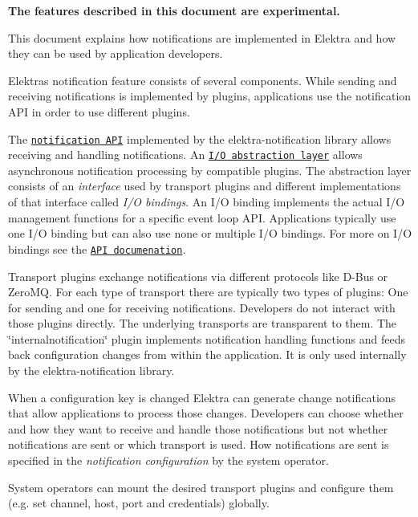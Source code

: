 {\bfseries The features described in this document are experimental.}

This document explains how notifications are implemented in Elektra and how they can be used by application developers.

Elektra\textquotesingle{}s notification feature consists of several components. While sending and receiving notifications is implemented by plugins, applications use the notification A\+PI in order to use different plugins.

The \href{https://doc.libelektra.org/api/current/html/group__kdbnotification.html}{\tt notification A\+PI} implemented by the {\ttfamily elektra-\/notification} library allows receiving and handling notifications. An \href{https://doc.libelektra.org/api/current/html/group__kdbio.html}{\tt I/O abstraction layer} allows asynchronous notification processing by compatible plugins. The abstraction layer consists of an {\itshape interface} used by transport plugins and different implementations of that interface called {\itshape I/O bindings}. An I/O binding implements the actual I/O management functions for a specific event loop A\+PI. Applications typically use one I/O binding but can also use none or multiple I/O bindings. For more on I/O bindings see the \href{https://doc.libelektra.org/api/current/html/group__kdbio.html}{\tt A\+PI documenation}.

Transport plugins exchange notifications via different protocols like D-\/\+Bus or Zero\+MQ. For each type of transport there are typically two types of plugins\+: One for sending and one for receiving notifications. Developers do not interact with those plugins directly. The underlying transports are transparent to them. The \char`\"{}internalnotification\char`\"{} plugin implements notification handling functions and feeds back configuration changes from within the application. It is only used internally by the {\ttfamily elektra-\/notification} library.



When a configuration key is changed Elektra can generate change notifications that allow applications to process those changes. Developers can choose whether and how they want to receive and handle those notifications but not whether notifications are sent or which transport is used. How notifications are sent is specified in the {\itshape notification configuration} by the system operator.

System operators can mount the desired transport plugins and configure them (e.\+g. set channel, host, port and credentials) globally.

